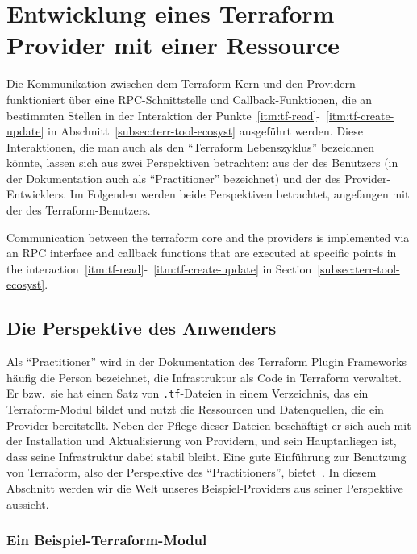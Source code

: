 \documentclass[paper=a4,11pt,numbers=noenddot]{article}
\begin{document}
\section{Entwicklung eines Terraform Provider mit einer Ressource}
\label{sec:creat-terr-prov}

Die Kommunikation zwischen dem Terraform Kern und den Providern funktioniert über eine RPC-Schnittstelle und Callback-Funktionen, die an bestimmten Stellen in der Interaktion der Punkte~\ref{itm:tf-read}-~\ref{itm:tf-create-update} in Abschnitt~\ref{subsec:terr-tool-ecosyst} ausgeführt werden. Diese Interaktionen, die man auch als den ``Terraform Lebenszyklus'' bezeichnen könnte, lassen sich aus zwei Perspektiven betrachten: aus der des Benutzers (in der Dokumentation auch als ``Practitioner'' bezeichnet) und der des Provider-Entwicklers. Im Folgenden werden beide Perspektiven betrachtet, angefangen mit der des Terraform-Benutzers.


Communication between the terraform core and the providers is implemented via an RPC interface and callback functions that are executed at specific points in the interaction~\ref{itm:tf-read}-~\ref{itm:tf-create-update} in Section~\ref{subsec:terr-tool-ecosyst}.

\subsection{Die Perspektive des Anwenders}
\label{subsec:practitioners-view}

Als ``Practitioner'' wird in der Dokumentation des Terraform Plugin Frameworks~\autocite{noauthor_terraform_framework_nodate} häufig die Person bezeichnet, die Infrastruktur als Code in Terraform verwaltet. Er bzw.\ sie hat einen Satz von \verb'.tf'-Dateien in einem Verzeichnis, das ein Terraform-Modul bildet und nutzt die Ressourcen und Datenquellen, die ein Provider bereitstellt. Neben der Pflege dieser Dateien beschäftigt er sich auch mit der Installation und Aktualisierung von Providern, und sein Hauptanliegen ist, dass seine Infrastruktur dabei stabil bleibt. Eine gute Einführung zur Benutzung von Terraform, also der Perspektive des ``Practitioners'', bietet~\autocite{brikman_terraform_2022}. In diesem Abschnitt werden wir die Welt unseres Beispiel-Providers aus seiner Perspektive aussieht.

\subsubsection{Ein Beispiel-Terraform-Modul}
\label{subsubsec:an-example-terraform}
\end{document}

